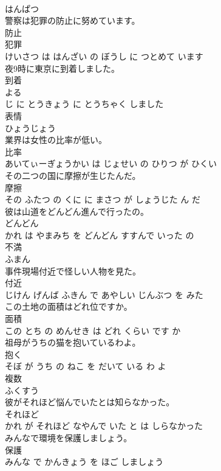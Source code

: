 \documentclass[8pt]{extreport}
\begin{document}
\begin{CJK}{UTF8}{min}
\\	はんぱつ		
\\	警察は犯罪の防止に努めています。	
\\	防止 
\\	犯罪 
\\	けいさつ は はんざい の ぼうし に つとめて います			
\\	夜9時に東京に到着しました。	
\\	到着 
\\	よる 
\\	じ に とうきょう に とうちゃく しました			
\\	表情	
\\	ひょうじょう		
\\	業界は女性の比率が低い。	
\\	比率 
\\	あいてぃーぎょうかい は じょせい の ひりつ が ひくい			
\\	その二つの国に摩擦が生じたんだ。	
\\	摩擦 
\\	その ふたつ の くに に まさつ が しょうじた ん だ			
\\	彼は山道をどんどん進んで行ったの。	
\\	どんどん 
\\	かれ は やまみち を どんどん すすんで いった の			
\\	不満	
\\	ふまん		
\\	事件現場付近で怪しい人物を見た。	
\\	付近 
\\	じけん げんば ふきん で あやしい じんぶつ を みた			
\\	この土地の面積はどれ位ですか。	
\\	面積 
\\	この とち の めんせき は どれ くらい です か			
\\	祖母がうちの猫を抱いているわよ。	
\\	抱く 
\\	そぼ が うち の ねこ を だいて いる わ よ			
\\	複数	
\\	ふくすう		
\\	彼がそれほど悩んでいたとは知らなかった。	
\\	それほど 
\\	かれ が それほど なやんで いた と は しらなかった			
\\	みんなで環境を保護しましょう。	
\\	保護 
\\	みんな で かんきょう を ほご しましょう			

\end{CJK}
\end{document}
